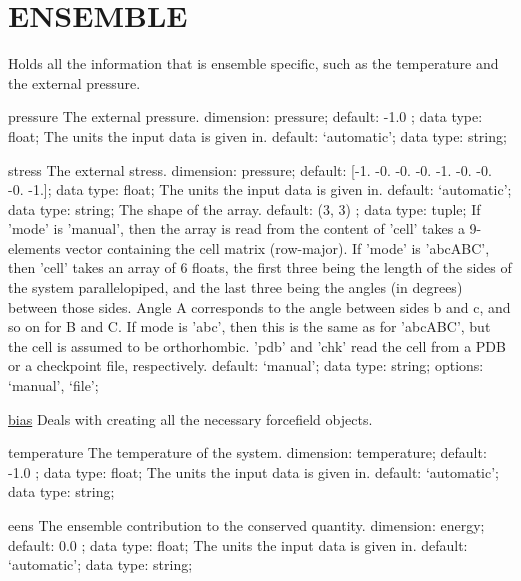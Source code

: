 \section{ENSEMBLE}
\label{ENSEMBLE}
\begin{ipifield}{}%
{Holds all the information that is ensemble specific, such as the temperature and the external pressure.}%
{}%
{}
\begin{ipifield}{pressure}%
{The external pressure.}%
{dimension: pressure; default:  -1.0 ; data type: float; }%
{%
{The units the input data is given in.}%
{default: `automatic'; data type: string; }%
}
\end{ipifield}
\begin{ipifield}{stress}%
{The external stress.}%
{dimension: pressure; default: 
      [-1. -0. -0. -0. -1. -0. -0. -0. -1.]; data type: float; }%
{%
{The units the input data is given in.}%
{default: `automatic'; data type: string; }%
%
{The shape of the array.}%
{default:  (3, 3) ; data type: tuple; }%
%
{If 'mode' is 'manual', then the array is read from the content of 'cell' takes a 9-elements vector containing the cell matrix (row-major). If 'mode' is 'abcABC', then 'cell' takes an array of 6 floats, the first three being the length of the sides of the system parallelopiped, and the last three being the angles (in degrees) between those sides. Angle A corresponds to the angle between sides b and c, and so on for B and C. If mode is 'abc', then this is the same as for 'abcABC', but the cell is assumed to be orthorhombic. 'pdb' and 'chk' read the cell from a PDB or a checkpoint file, respectively.}%
{default: `manual'; data type: string; options: `manual', `file'; }%
}
\end{ipifield}
\begin{ipifield}{\hyperref[FORCES]{bias}}%
{Deals with creating all the necessary forcefield objects.}%
{}%
{}
\end{ipifield}
\begin{ipifield}{temperature}%
{The temperature of the system.}%
{dimension: temperature; default:  -1.0 ; data type: float; }%
{%
{The units the input data is given in.}%
{default: `automatic'; data type: string; }%
}
\end{ipifield}
\begin{ipifield}{eens}%
{The ensemble contribution to the conserved quantity.}%
{dimension: energy; default:  0.0 ; data type: float; }%
{%
{The units the input data is given in.}%
{default: `automatic'; data type: string; }%
}
\end{ipifield}
\end{ipifield}
